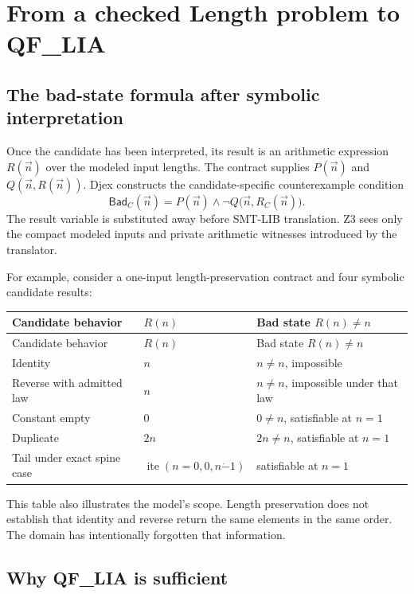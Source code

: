 \documentclass[10pt,letterpaper,oneside]{report}
\newcommand{\bad}{\mathsf{Bad}}
\begin{document}
\chapter{From a checked Length problem to QF\_LIA}
\label{chap:length-query}

\section{The bad-state formula after symbolic interpretation}

Once the candidate has been interpreted, its result is an arithmetic expression $R(\vec n)$ over the modeled input lengths. The contract supplies $P(\vec n)$ and $Q(\vec n,R(\vec n))$. Djex constructs the candidate-specific counterexample condition
\[
  \bad_C(\vec n)
  =P(\vec n)\land\neg Q\bigl(\vec n,R_C(\vec n)\bigr).
\]
The result variable is substituted away before SMT-LIB translation. Z3 sees only the compact modeled inputs and private arithmetic witnesses introduced by the translator.

For example, consider a one-input length-preservation contract and four symbolic candidate results:

\begin{longtable}{@{}L{0.22\textwidth}L{0.24\textwidth}L{0.48\textwidth}@{}}
\toprule
Candidate behavior & $R(n)$ & Bad state $R(n)\ne n$ \\
\midrule
\endfirsthead
\toprule
Candidate behavior & $R(n)$ & Bad state $R(n)\ne n$ \\
\midrule
\endhead
\bottomrule
\endfoot
Identity & $n$ & $n\ne n$, impossible \\
Reverse with admitted law & $n$ & $n\ne n$, impossible under that law \\
Constant empty & $0$ & $0\ne n$, satisfiable at $n=1$ \\
Duplicate & $2n$ & $2n\ne n$, satisfiable at $n=1$ \\
Tail under exact spine case & $\operatorname{ite}(n=0,0,n\mathbin{\dot{-}}1)$ & satisfiable at $n=1$ \\
\end{longtable}

This table also illustrates the model's scope. Length preservation does not establish that identity and reverse return the same elements in the same order. The domain has intentionally forgotten that information.

\section{Why QF\_LIA is sufficient}
\end{document}

